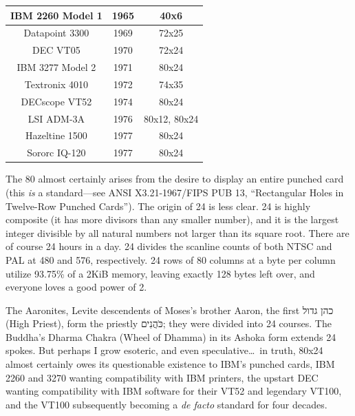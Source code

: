 \documentclass[letterpaper,10pt]{article}
\begin{document}
\vspace{.25in}

\begin{center}
  \begin{tabular}{ |c|c|c| }
    \hline
    IBM 2260 Model 1 & 1965 & 40x6 \\
    \hline
    Datapoint 3300 & 1969 & 72x25 \\
    \hline
    DEC VT05 & 1970 & 72x24 \\
    \hline
    IBM 3277 Model 2 & 1971 & 80x24 \\
    \hline
    Textronix 4010 & 1972 & 74x35 \\
    \hline
    DECscope VT52 & 1974 & 80x24 \\
    \hline
    LSI ADM-3A & 1976 & 80x12, 80x24 \\
    \hline
    Hazeltine 1500 & 1977 & 80x24 \\
    \hline
    Sororc IQ-120 & 1977 & 80x24 \\
    \hline
  \end{tabular}
\end{center}

\vspace{.25in}

The 80 almost certainly arises from the desire to display an entire punched card
(this \textit{is} a standard---see ANSI X3.21-1967/FIPS PUB 13, ``Rectangular
Holes in Twelve-Row Punched Cards'')\cite{sonicdelay}. The origin of 24 is less
clear. 24 is highly composite (it has more divisors than any smaller number),
and it is the largest integer divisible by all natural numbers not larger than its
square root. There are of course 24 hours in a day. 24 divides the scanline
counts of both NTSC and PAL at 480 and 576, respectively. 24 rows of
80 columns at a byte per column utilize 93.75\% of a 2KiB memory, leaving exactly
128 bytes left over, and everyone loves a good power of 2.

The Aaronites, Levite descendents of Moses's brother Aaron, the first
\texthebrew{כהן גדול}
(High Priest),
form the priestly \texthebrew{כֹּהֲנִים}; they were divided into 24 courses. The Buddha's Dharma Chakra (Wheel of Dhamma)
in its Ashoka form extends 24 spokes. But perhaps I grow esoteric, and even
speculative\ldots\ in truth, 80x24 almost certainly owes its questionable
existence to IBM's punched cards, IBM 2260 and 3270 wanting compatibility with
IBM printers, the upstart DEC wanting compatibility with IBM software for their
VT52 and legendary VT100, and the VT100 subsequently becoming a \textit{de facto} standard for
four decades.
\end{document}
